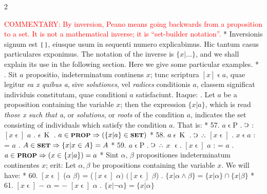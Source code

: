 \documentclass{book}
\newcommand{\C}{\mathop{\sbox0{$\displaystyle$$\reflectbox{C}$} %
\raisebox{-\height+\ht0-0.05cm}[\ht0][\dp0]{\scalebox{0.8}[0.8]{\copy0}}}\displaylimits} %
\newcommand{\pppNoSpace}{\leavevmode\lower0ex\hbox{.}\kern-0.1em\raise0.7ex\hbox{.}\kern-0.1em\lower0ex\hbox{.}} %
\newcommand{\smallIn}{\ensuremath{\mathrel{\epsilon}}}
\newcommand{\K}{\mathop{\thinspace \text{K} \thinspace}}
\newcommand{\setOfSets}{\mathop{\text{{\footnotesize \textbf{SET}}}}}
\newcommand{\prop}{\mathord{\text{{\footnotesize \textbf{PROP}}}}}
\renewcommand{\rightarrow}{\Rightarrow}
\newcommand\commentary[1]{\textcolor{red}{COMMENTARY: #1}}
\newenvironment{translateTwoCol}
               { %
                 \columnratio{0.5, 0.5}
                 \begin{paracol}{2}
                 \newcommand{\LAT}{\switchcolumn[0]*}
                 \newcommand{\ENG}{\switchcolumn[1]}
               }
               { %
                 \let\ENG\undefined
                 \let\LAT\undefined
                 \end{paracol}
               }
\begin{document}
\begin{translateTwoCol}
\ENG
\commentary{By inversion, Peano means going backwards from a proposition to a set.  It is not a mathematical inverse; it is ``set-builder notation''.}
\LAT  
\quad Inversionis signum est $\scalebox{1.5}[0.8]{[\scalebox{0.2}{ \ }]}$, eiusque usum in sequenti numero explicabimus. Hic tantum casus particulares exponimus.
\ENG
\quad The notation of the inverse is $\{x | \ldots\}$, and we shall explain its use in the following section. Here we give some particular examples.  %
\LAT
{}. Sit $a$ propositio, indeterminatum continens $x$; tunc scriptura $[x] \smallIn a$, quae legitur \emph{ea x quibus a}, sive \emph{solutiones}, vel \emph{radices} conditionis $a$, classem significat individuis constitutam, quae conditioni $a$ satisfaciunt. Itaque:
\ENG
{}. Let $a$ be a proposition containing the variable $x$; then the expression $\{ x | a \}$, which is read \emph{those x such that a}, or \emph{solutions}, or \emph{roots} of the condition $a$, indicates the set consisting of individuals which satisfy the condition $a$. That is:
\LAT
57. \hspace{0.67cm} $a \smallIn \text{P}$ . $\C$ : $[x\smallIn]$ $a$ . $\smallIn \K$
\ENG
57. \hspace{0.67cm} $a \in \prop \rightarrow ( \{x | a \} \in \setOfSets )$ 
\LAT
58. \hspace{0.67cm} $a \smallIn \K$ . $\C$ $\pppNoSpace$ $[x\smallIn]$ . $x \smallIn a$ : = $a$
\ENG
58. \hspace{0.67cm} $A \in \setOfSets \rightarrow \{ x | x \in A \} = A $
\LAT
59. \hspace{0.67cm} $a \smallIn \text{P}$ . $\C$ $\pppNoSpace$ $x$ \smallIn . $[x\smallIn]$ $a$ : = $a$
\ENG
59. \hspace{0.67cm}  $a \in \prop \rightarrow (x \in \{x | a \}) = a$
\LAT
\quad Sint $\alpha$, $\beta$ propositiones indeterminatum continentes $x$; erit:
\ENG
\quad Let $\alpha, \beta$ be propositions containing the variable $x$. We will have:
\LAT
60. \hspace{0.67cm} $[x\smallIn]$ ($\alpha$ $\beta$) = ($[x\smallIn]$ $\alpha)$ $([x\smallIn]$ $\beta$)
\ENG
60. \hspace{0.67cm} $\{x | \alpha \wedge \beta\}=\{x|\alpha\} \cap \{x | \beta\}$
\LAT
61. \hspace{0.67cm} $[x\smallIn]$ $-$ $\alpha$ = $-$ $[x\smallIn]$ $\alpha$
\ENG
61. \hspace{0.67cm} $\{x | \neg \alpha \} = \overline{\{x | \alpha\}}$

\end{translateTwoCol}
\end{document}
